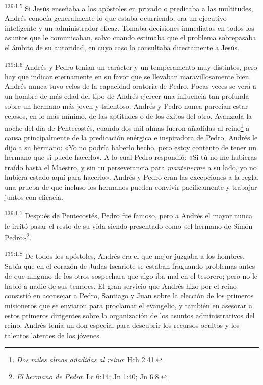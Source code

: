 \par
\textsuperscript{139:1.5} Si Jesús enseñaba a los apóstoles en privado o predicaba a las multitudes, Andrés conocía generalmente lo que estaba ocurriendo; era un ejecutivo inteligente y un administrador eficaz. Tomaba decisiones inmediatas en todos los asuntos que le comunicaban, salvo cuando estimaba que el problema sobrepasaba el ámbito de su autoridad, en cuyo caso lo consultaba directamente a Jesús.

\par
\textsuperscript{139:1.6} Andrés y Pedro tenían un carácter y un temperamento muy distintos, pero hay que indicar eternamente en su favor que se llevaban maravillosamente bien. Andrés nunca tuvo celos de la capacidad oratoria de Pedro. Pocas veces se verá a un hombre de más edad del tipo de Andrés ejercer una influencia tan profunda sobre un hermano más joven y talentoso. Andrés y Pedro nunca parecían estar celosos, en lo más mínimo, de las aptitudes o de los éxitos del otro. Avanzada la noche del día de Pentecostés, cuando dos mil almas fueron añadidas al reino\footnote{\textit{Dos miles almas añadidas al reino}: Hch 2:41.} a causa principalmente de la predicación enérgica e inspiradora de Pedro, Andrés le dijo a su hermano: «Yo no podría haberlo hecho, pero estoy contento de tener un hermano que sí puede hacerlo». A lo cual Pedro respondió: «Si tú no me hubieras traído hasta el Maestro, y sin tu perseverancia para \textit{mantenerme} a su lado, yo no hubiera estado aquí para hacerlo». Andrés y Pedro eran las excepciones a la regla, una prueba de que incluso los hermanos pueden convivir pacíficamente y trabajar juntos con eficacia.

\par
\textsuperscript{139:1.7} Después de Pentecostés, Pedro fue famoso, pero a Andrés el mayor nunca le irritó pasar el resto de su vida siendo presentado como «el hermano de Simón Pedro»\footnote{\textit{El hermano de Pedro}: Lc 6:14; Jn 1:40; Jn 6:8.}.

\par
\textsuperscript{139:1.8} De todos los apóstoles, Andrés era el que mejor juzgaba a los hombres. Sabía que en el corazón de Judas Iscariote se estaban fraguando problemas antes de que ninguno de los otros sospechara que algo iba mal en el tesorero; pero no le habló a nadie de sus temores. El gran servicio que Andrés hizo por el reino consistió en aconsejar a Pedro, Santiago y Juan sobre la elección de los primeros misioneros que se enviaron para proclamar el evangelio, y también en asesorar a estos primeros dirigentes sobre la organización de los asuntos administrativos del reino. Andrés tenía un don especial para descubrir los recursos ocultos y los talentos latentes de los jóvenes.

